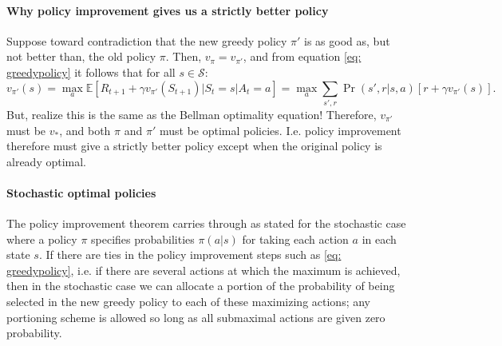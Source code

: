 \documentclass[12pt]{article}
\begin{document}
\paragraph{Why policy improvement gives us a strictly better policy} Suppose toward contradiction that the new greedy policy $\pi'$ is as good as, but not better than, the old policy $\pi$. Then, $v_\pi = v_{\pi'}$, and from equation
\ref{eq: greedypolicy} it follows that for all $s \in \mathcal S$:
\[
  v_{\pi'}(s) = \max_a \mathbb E \left[R_{t+1} + \gamma v_{\pi'}(S_{t+1}) | S_t= s | A_t = a \right] = \max_a \sum_{s',r} \Pr(s',r|s,a)\left[r + \gamma v_{\pi'}(s)\right].
\]
But, realize this is the same as the Bellman optimality equation! Therefore, $v_{\pi'}$ must be $v_*$, and both $\pi$ and $\pi'$ must be optimal policies. I.e. policy improvement therefore must give a strictly better policy except when the original policy is already optimal.

\paragraph{Stochastic optimal policies} The policy improvement theorem carries through as stated for the stochastic case where a policy $\pi$ specifies probabilities $\pi(a|s)$ for taking each action $a$ in each state $s$. If there are ties in the policy improvement steps such as \ref{eq: greedypolicy}, i.e. if there are several actions at which the maximum is achieved, then in the stochastic case we can allocate a portion of the probability of being selected in the new greedy policy to each of these maximizing actions; any portioning scheme is allowed so long as all submaximal actions are given zero probability.
\end{document}

